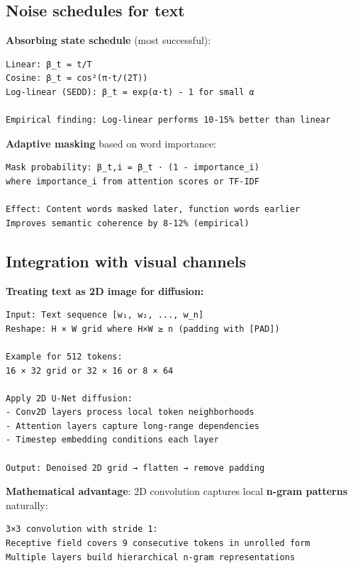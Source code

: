 \documentclass[11pt]{article}
\begin{document}
\subsection{Noise schedules for text}

\textbf{Absorbing state schedule} (most successful):

\begin{verbatim}
Linear: β_t = t/T
Cosine: β_t = cos²(π·t/(2T))
Log-linear (SEDD): β_t = exp(α·t) - 1 for small α

Empirical finding: Log-linear performs 10-15% better than linear
\end{verbatim}

\textbf{Adaptive masking} based on word importance:

\begin{verbatim}
Mask probability: β_t,i = β_t · (1 - importance_i)
where importance_i from attention scores or TF-IDF

Effect: Content words masked later, function words earlier
Improves semantic coherence by 8-12% (empirical)
\end{verbatim}

\subsection{Integration with visual channels}

\textbf{Treating text as 2D image for diffusion:}

\begin{verbatim}
Input: Text sequence [w₁, w₂, ..., w_n]
Reshape: H × W grid where H×W ≥ n (padding with [PAD])

Example for 512 tokens:
16 × 32 grid or 32 × 16 or 8 × 64

Apply 2D U-Net diffusion:
- Conv2D layers process local token neighborhoods
- Attention layers capture long-range dependencies
- Timestep embedding conditions each layer

Output: Denoised 2D grid → flatten → remove padding
\end{verbatim}

\textbf{Mathematical advantage}: 2D convolution captures local \textbf{n-gram patterns} naturally:

\begin{verbatim}
3×3 convolution with stride 1:
Receptive field covers 9 consecutive tokens in unrolled form
Multiple layers build hierarchical n-gram representations
\end{verbatim}
\end{document}
